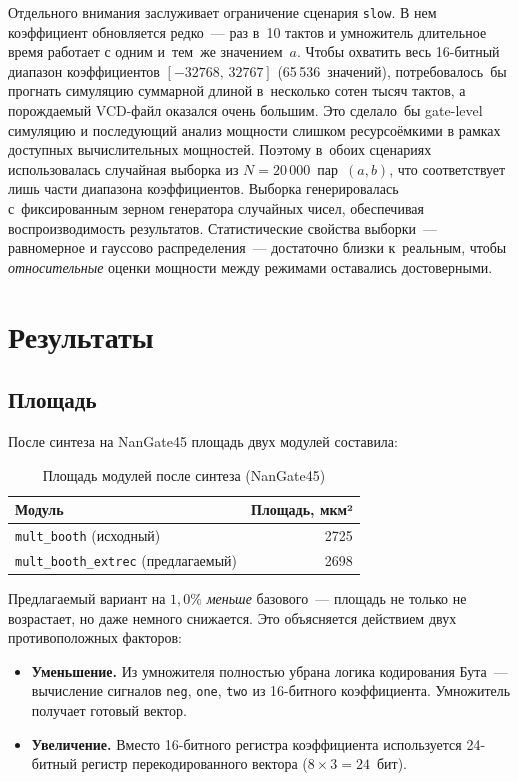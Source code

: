 \documentclass[a4paper, 12pt, oneside]{report}
\begin{document}
Отдельного внимания заслуживает ограничение сценария
\texttt{slow}. В нем коэффициент
обновляется редко~--- раз в~10 тактов и
умножитель длительное время работает с одним и~тем~же значением~$a$.
Чтобы охватить весь 16-битный диапазон коэффициентов
$[-32768,\,32767]$ (65\,536~значений), потребовалось~бы прогнать
симуляцию суммарной длиной в~несколько сотен тысяч тактов, а
порождаемый VCD-файл оказался очень большим. Это сделало~бы
gate-level симуляцию и последующий анализ мощности слишком 
ресурсоёмкими в рамках доступных вычислительных мощностей.
Поэтому в~обоих сценариях использовалась случайная выборка из
$N = 20\,000$~пар~$(a, b)$, что соответствует лишь части диапазона
коэффициентов. Выборка генерировалась с~фиксированным зерном
генератора случайных чисел, обеспечивая воспроизводимость
результатов. Статистические свойства выборки~--- равномерное и
гауссово распределения~--- достаточно близки к~реальным, чтобы
\textit{относительные} оценки мощности между режимами оставались
достоверными.

\chapter{Результаты}

\section{Площадь}

После синтеза на NanGate45 площадь двух модулей составила:

\begin{table}[H]
  \caption{Площадь модулей после синтеза (NanGate45)}
  \label{tab:area}
  \centering
  \renewcommand{\arraystretch}{1.3}
  \begin{tabular}{lr}
    \toprule
    Модуль & Площадь, мкм² \\
    \midrule
    \texttt{mult\_booth} (исходный)            & 2725 \\
    \texttt{mult\_booth\_extrec} (предлагаемый) & 2698 \\
    \bottomrule
  \end{tabular}
\end{table}

Предлагаемый вариант на $1{,}0\%$ \textit{меньше} базового~--- площадь не
только не возрастает, но даже немного снижается. Это объясняется действием
двух противоположных факторов:
\begin{itemize}
  \item \textbf{Уменьшение.} Из умножителя полностью убрана
        логика кодирования Бута~--- вычисление сигналов
        \texttt{neg}, \texttt{one}, \texttt{two} из 16-битного
        коэффициента. Умножитель получает готовый вектор.
  \item \textbf{Увеличение.} Вместо 16-битного регистра
        коэффициента используется 24-битный регистр
        перекодированного вектора ($8 \times 3 = 24$~бит).
\end{itemize}
\end{document}
